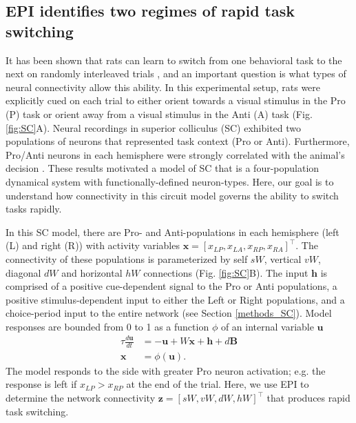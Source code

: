 \documentclass[11pt]{article}
\begin{document}
\subsection{EPI identifies two regimes of rapid task switching} \label{results_SC}
It has been shown that rats can learn to switch from one behavioral task to the next on randomly interleaved trials \cite{duan2015requirement}, and an important question is what types of neural connectivity allow this ability.
In this experimental setup, rats were explicitly cued on each trial to either orient towards a visual stimulus in the Pro (P) task or orient away from a visual stimulus in the Anti (A) task (Fig. \ref{fig:SC}A). 
Neural recordings in superior colliculus (SC) exhibited two populations of neurons that represented task context (Pro or Anti).
Furthermore, Pro/Anti neurons in each hemisphere were strongly correlated with the animal's decision \cite{duan2018collicular}.
These results motivated a model of SC that is a four-population dynamical system with functionally-defined neuron-types.
Here, our goal is to understand how connectivity in this circuit model governs the ability to switch tasks rapidly.

In this SC model, there are Pro- and Anti-populations in each hemisphere (left (L) and right (R)) with activity variables $\mathbf{x} = [x_{LP}, x_{LA}, x_{RP}, x_{RA}]^\top$.
The connectivity of these populations is parameterized by self $sW$, vertical $vW$, diagonal $dW$ and horizontal $hW$ connections (Fig. \ref{fig:SC}B).
The input $\mathbf{h}$ is comprised of a positive cue-dependent signal to the Pro or Anti populations, a positive stimulus-dependent input to either the Left or Right populations, and a choice-period input to the entire network (see Section \ref{methods_SC}).
Model responses are bounded from 0 to 1 as a function $\phi$ of an internal variable $\mathbf{u}$
\begin{equation}
\begin{split}
\tau \frac{d\mathbf{u}}{dt} &= -\mathbf{u} + W\mathbf{x} + \mathbf{h} + d\mathbf{B} \\
\mathbf{x} &= \phi(\mathbf{u}).
\end{split}
\end{equation}
The model responds to the side with greater Pro neuron activation; e.g. the response is left if $x_{LP} > x_{RP}$ at the end of the trial.  
Here, we use EPI to determine the network connectivity $\mathbf{z} = [sW, vW, dW, hW]^{\top}$ that produces rapid task switching.
\end{document}
